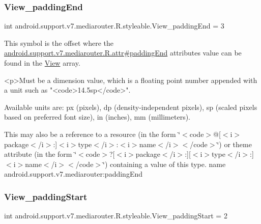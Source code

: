 \subsubsection{\texorpdfstring{View\+\_\+padding\+End}{View\_paddingEnd}}
{\footnotesize\ttfamily int android.\+support.\+v7.\+mediarouter.\+R.\+styleable.\+View\+\_\+padding\+End = 3\hspace{0.3cm}{\ttfamily [static]}}

This symbol is the offset where the \hyperlink{classandroid_1_1support_1_1v7_1_1mediarouter_1_1R_1_1attr_ab54f21235724f13f9760dad1e6989074}{android.\+support.\+v7.\+mediarouter.\+R.\+attr\#padding\+End} attribute\textquotesingle{}s value can be found in the \hyperlink{classandroid_1_1support_1_1v7_1_1mediarouter_1_1R_1_1styleable_a69727b595e0fa598a4ad38166ab404a9}{View} array.

\begin{DoxyVerb}      <p>Must be a dimension value, which is a floating point number appended with a unit such as "<code>14.5sp</code>".
\end{DoxyVerb}
 Available units are\+: px (pixels), dp (density-\/independent pixels), sp (scaled pixels based on preferred font size), in (inches), mm (millimeters). 

This may also be a reference to a resource (in the form \char`\"{}$<$code$>$@\mbox{[}$<$i$>$package$<$/i$>$\+:\mbox{]}$<$i$>$type$<$/i$>$\+:$<$i$>$name$<$/i$>$$<$/code$>$\char`\"{}) or theme attribute (in the form \char`\"{}$<$code$>$?\mbox{[}$<$i$>$package$<$/i$>$\+:\mbox{]}\mbox{[}$<$i$>$type$<$/i$>$\+:\mbox{]}$<$i$>$name$<$/i$>$$<$/code$>$\char`\"{}) containing a value of this type.  name android.\+support.\+v7.\+mediarouter\+:padding\+End \mbox{\label{classandroid_1_1support_1_1v7_1_1mediarouter_1_1R_1_1styleable_a22686a2c312cc840de8e771ac598731f}} 
\subsubsection{\texorpdfstring{View\+\_\+padding\+Start}{View\_paddingStart}}
{\footnotesize\ttfamily int android.\+support.\+v7.\+mediarouter.\+R.\+styleable.\+View\+\_\+padding\+Start = 2\hspace{0.3cm}{\ttfamily [static]}}

